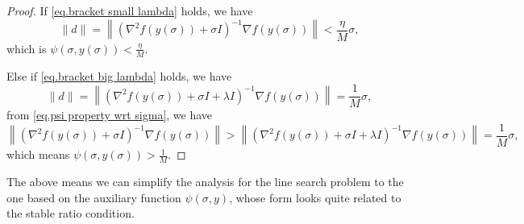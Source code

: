 \documentclass{mcom-l}
\numberwithin{equation}{section}
\begin{document}
\begin{proof}
    If \eqref{eq.bracket small lambda} holds, we have
    \begin{equation*}
        \|d\| = \left \|\left(\nabla^2 f(y(\sigma))+\sigma I\right)^{-1}\nabla f(y(\sigma))\right\|<\frac{\eta}{M}\sigma,
    \end{equation*}
    which is $\psi(\sigma,y(\sigma))<\frac{\eta}{M}$.

    Else if \eqref{eq.bracket big lambda} holds, we have
    \begin{equation*}
        \|d\| = \left \|\left(\nabla^2 f(y(\sigma))+\sigma I+\lambda I\right)^{-1}\nabla f(y(\sigma))\right\|=\frac{1}{M}\sigma,
    \end{equation*}
    from \eqref{eq.psi property wrt sigma}, we have
    \begin{equation*}
        \left \|\left(\nabla^2 f(y(\sigma))+\sigma I\right)^{-1}\nabla f(y(\sigma))\right\|>\left \|\left(\nabla^2 f(y(\sigma))+\sigma I+\lambda I\right)^{-1}\nabla f(y(\sigma))\right\|=\frac{1}{M}\sigma,
    \end{equation*}
    which means $\psi \left(\sigma,y(\sigma)\right)>\frac{1}{M}$.
\end{proof}
The above  means we can simplify the analysis for the line search problem to the one based on the auxiliary function $\psi(\sigma,y)$, whose form looks quite related to the stable ratio condition.
\end{document}
